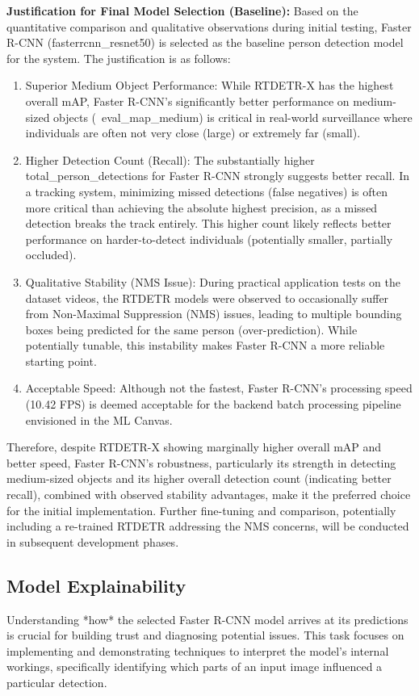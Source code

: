 \textbf{Justification for Final Model Selection (Baseline):}
Based on the quantitative comparison and qualitative observations during initial testing, Faster R-CNN (fasterrcnn\_resnet50) is selected as the baseline person detection model for the system. The justification is as follows:
\begin{enumerate}
    \item Superior Medium Object Performance: While RTDETR-X has the highest overall mAP, Faster R-CNN's significantly better performance on medium-sized objects (\ {eval\_map\_medium}) is critical in real-world surveillance where individuals are often not very close (large) or extremely far (small).
    \item Higher Detection Count (Recall): The substantially higher {total\_person\_detections} for Faster R-CNN strongly suggests better recall. In a tracking system, minimizing missed detections (false negatives) is often more critical than achieving the absolute highest precision, as a missed detection breaks the track entirely. This higher count likely reflects better performance on harder-to-detect individuals (potentially smaller, partially occluded).
    \item Qualitative Stability (NMS Issue): During practical application tests on the dataset videos, the RTDETR models were observed to occasionally suffer from Non-Maximal Suppression (NMS) issues, leading to multiple bounding boxes being predicted for the same person (over-prediction). While potentially tunable, this instability makes Faster R-CNN a more reliable starting point.
    \item Acceptable Speed: Although not the fastest, Faster R-CNN's processing speed (10.42 FPS) is deemed acceptable for the backend batch processing pipeline envisioned in the ML Canvas.
\end{enumerate}
Therefore, despite RTDETR-X showing marginally higher overall mAP and better speed, Faster R-CNN's robustness, particularly its strength in detecting medium-sized objects and its higher overall detection count (indicating better recall), combined with observed stability advantages, make it the preferred choice for the initial implementation. Further fine-tuning and comparison, potentially including a re-trained RTDETR addressing the NMS concerns, will be conducted in subsequent development phases.

\subsection{Model Explainability}
\label{subsection:model_explainability}
Understanding *how* the selected Faster R-CNN model arrives at its predictions is crucial for building trust and diagnosing potential issues. This task focuses on implementing and demonstrating techniques to interpret the model's internal workings, specifically identifying which parts of an input image influenced a particular detection.

